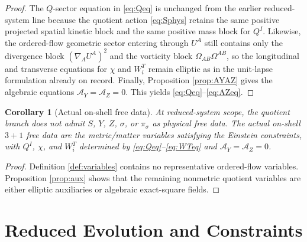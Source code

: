 \documentclass[11pt]{article}
\newcommand{\AY}{\mathcal A_Y}
\newcommand{\AZ}{\mathcal A_Z}
\newtheorem{corollary}{Corollary}
\begin{document}
\begin{proof}
The \(Q\)-sector equation in \eqref{eq:Qeq} is unchanged from the earlier reduced-system line because the quotient action \eqref{eq:Sphys} retains the same positive projected spatial kinetic block and the same positive mass block for \(Q^I\). Likewise, the ordered-flow geometric sector entering through \(U^A\) still contains only the divergence block \((\nabla_AU^A)^2\) and the vorticity block \(\Omega_{AB}\Omega^{AB}\), so the longitudinal and transverse equations for \(\chi\) and \(W_i^T\) remain elliptic as in the unit-lapse formulation already on record. Finally, Proposition \ref{prop:AYAZ} gives the algebraic equations \(\AY=\AZ=0\). This yields \eqref{eq:Qeq}--\eqref{eq:AZeq}.
\end{proof}

\begin{corollary}[Actual on-shell free data]
\label{cor:freedata}
At reduced-system scope, the quotient branch does \emph{not} admit \(S\), \(Y\), \(Z\), \(\sigma\), or \(\pi_\sigma\) as physical free data. The actual on-shell \(3+1\) free data are the metric/matter variables satisfying the Einstein constraints, with \(Q^I\), \(\chi\), and \(W_i^T\) determined by \eqref{eq:Qeq}--\eqref{eq:WTeq} and \(\AY=\AZ=0\).
\end{corollary}

\begin{proof}
Definition \ref{def:variables} contains no representative ordered-flow variables. Proposition \ref{prop:aux} shows that the remaining nonmetric quotient variables are either elliptic auxiliaries or algebraic exact-square fields.
\end{proof}

\section{Reduced Evolution and Constraints}
\end{document}
